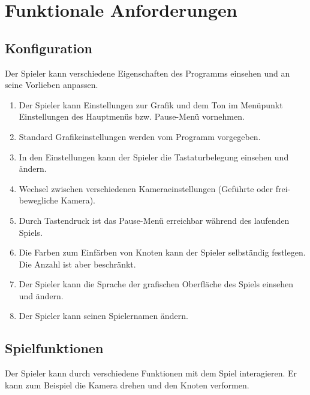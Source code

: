 \chapter{Funktionale Anforderungen}


\renewcommand{\theenumi}{/F\_\arabic{enumi}0/}
\renewcommand{\labelenumi}{\theenumi}



\section{Konfiguration}
Der Spieler kann verschiedene Eigenschaften des Programms einsehen und an seine Vorlieben anpassen.
\begin{enumerate}
 
\item Der Spieler kann Einstellungen zur Grafik und dem Ton im Menüpunkt Einstellungen des Hauptmenüs bzw. Pause-Menü vornehmen.
\item Standard Grafikeinstellungen werden vom Programm vorgegeben.
\item In den Einstellungen kann der Spieler die Tastaturbelegung einsehen und  ändern. %
\item Wechsel zwischen verschiedenen Kameraeinstellungen (Geführte oder frei-bewegliche Kamera).  %
\item Durch Tastendruck ist das Pause-Menü erreichbar während des laufenden Spiels.
\item Die Farben zum Einfärben von Knoten kann der Spieler selbständig festlegen. Die Anzahl ist aber beschränkt. %
\item Der Spieler kann die Sprache der grafischen Oberfläche des Spiels einsehen und ändern. %
\item Der Spieler kann seinen Spielernamen ändern.

\end{enumerate}

\section{Spielfunktionen}
Der Spieler kann durch verschiedene Funktionen mit dem Spiel interagieren. Er kann zum Beispiel die Kamera drehen und den Knoten verformen. 

